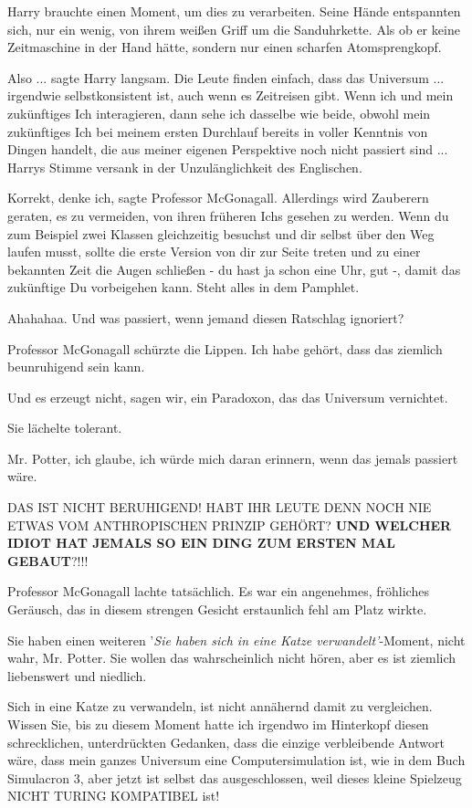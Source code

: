 Harry brauchte einen Moment, um dies zu verarbeiten. Seine Hände entspannten
sich, nur ein wenig, von ihrem weißen Griff um die Sanduhrkette. Als ob er keine
Zeitmaschine in der Hand hätte, sondern nur einen scharfen Atomsprengkopf.

\glqq{}Also ...\grqq{} sagte Harry langsam. \glqq{}Die Leute finden einfach, dass
das Universum ... irgendwie selbstkonsistent ist, auch wenn es Zeitreisen gibt.
Wenn ich und mein zukünftiges Ich interagieren, dann sehe ich dasselbe wie
beide, obwohl mein zukünftiges Ich bei meinem ersten Durchlauf bereits in voller
Kenntnis von Dingen handelt, die aus meiner eigenen Perspektive noch nicht
passiert sind ...\grqq{} Harrys Stimme versank in der Unzulänglichkeit des
Englischen.

\glqq{}Korrekt, denke ich\grqq{}, sagte Professor McGonagall. \glqq{}Allerdings
wird Zauberern geraten, es zu vermeiden, von ihren früheren Ichs gesehen zu
werden. Wenn du zum Beispiel zwei Klassen gleichzeitig besuchst und dir selbst
über den Weg laufen musst, sollte die erste Version von dir zur Seite treten und
zu einer bekannten Zeit die Augen schließen - du hast ja schon eine Uhr, gut -,
damit das zukünftige Du vorbeigehen kann. Steht alles in dem Pamphlet.\grqq{}

\glqq{}Ahahahaa. Und was passiert, wenn jemand diesen Ratschlag ignoriert?\grqq{}

Professor McGonagall schürzte die Lippen. \glqq{}Ich habe gehört, dass das
ziemlich beunruhigend sein kann.\grqq{}

\glqq{}Und es erzeugt nicht, sagen wir, ein Paradoxon, das das Universum
vernichtet.\grqq{}

Sie lächelte tolerant.

\glqq{}Mr. Potter, ich glaube, ich würde mich daran erinnern, wenn das jemals
passiert wäre.\grqq{}

\glqq{}DAS IST NICHT BERUHIGEND! HABT IHR LEUTE DENN NOCH NIE ETWAS VOM
ANTHROPISCHEN PRINZIP GEHÖRT? \textbf{UND WELCHER IDIOT HAT JEMALS SO EIN DING
ZUM ERSTEN MAL GEBAUT}?!!!\grqq{}

Professor McGonagall lachte tatsächlich. Es war ein angenehmes, fröhliches
Geräusch, das in diesem strengen Gesicht erstaunlich fehl am Platz wirkte.

\glqq{}Sie haben einen weiteren '\emph{Sie haben sich in eine Katze
verwandelt'}-Moment, nicht wahr, Mr. Potter. Sie wollen das wahrscheinlich nicht
hören, aber es ist ziemlich liebenswert und niedlich.\grqq{}

\glqq{}Sich in eine Katze zu verwandeln, ist nicht annähernd damit zu
vergleichen. Wissen Sie, bis zu diesem Moment hatte ich irgendwo im Hinterkopf
diesen schrecklichen, unterdrückten Gedanken, dass die einzige verbleibende
Antwort wäre, dass mein ganzes Universum eine Computersimulation ist, wie in dem
Buch Simulacron 3, aber jetzt ist selbst das ausgeschlossen, weil dieses kleine
Spielzeug NICHT TURING KOMPATIBEL ist!

